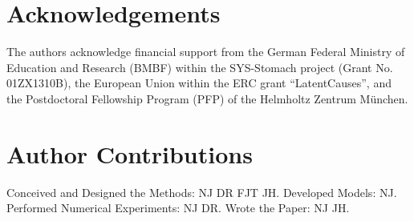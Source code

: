 \documentclass[10pt,letterpaper]{article}
\begin{document}
\section*{Acknowledgements}


The authors acknowledge financial support from the German Federal Ministry of Education and Research (BMBF) within the SYS-Stomach project (Grant No. 01ZX1310B), the European Union within the ERC grant ``LatentCauses'', and the Postdoctoral Fellowship Program (PFP) of the Helmholtz Zentrum M\"unchen.

\section*{Author Contributions}

Conceived and Designed the Methods: NJ DR FJT JH.
Developed Models: NJ.
Performed Numerical Experiments: NJ DR.
Wrote the Paper: NJ JH.

\nolinenumbers


\end{document}
